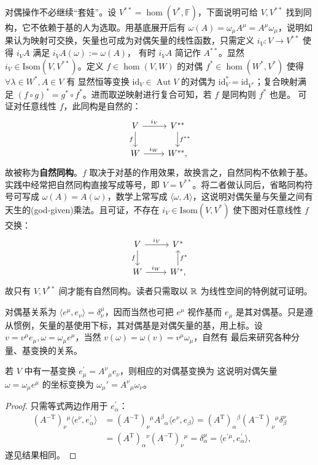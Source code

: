 对偶操作不必继续“套娃”。设 $V^{**}=\hom(V^*,\mathbb F)$，下面说明可给 $V,V^{**}$ 找到同构，它不依赖于基的人为选取。用基底展开后有 $\omega(A)=\omega_\mu A^\mu=A^\mu\omega_\mu$，说明如果认为映射可交换，矢量也可成为对偶矢量的线性函数，只需定义 $i_V:V\to V^{**}$ 使得 $i_V A$ 满足 $i_V A(\omega):=\omega(A)$，
有时 $i_V A$ 简记作 $A^{**}$。显然 $i_V\in\mathrm{Isom}(V,V^{**})$。定义 $f\in\hom(V,W)$ 的对偶 $f^*\in\hom(W^*, V^*)$ 使得 $\forall\lambda\in W^*,A\in V$ 有
显然恒等变换 $\mathrm{id}_V\in \operatorname{Aut} V$ 的对偶为 $\mathrm{id}_V^*=\mathrm{id}_{V^*}$；复合映射满足 $(f\circ g)^*=g^*\circ f^*$。进而取逆映射进行复合可知，若 $f$ 是同构则 $f^*$ 也是。
可证对任意线性 $f$，此同构是自然的：
\[\begin{tikzcd}
    V \arrow[r, "i_V"] \ar[d, "f"'] & V^{**} \arrow[d, "f^{**}"] \\
    W \arrow[r, "i_W"] & W^{**} ,
\end{tikzcd}\]
故被称为\textbf{自然同构}。$f$ 取决于对基的作用效果，故换言之，自然同构不依赖于基。实践中经常把自然同构直接写成等号，即 $V=V^{* *}$。将二者做认同后，省略同构符号可写成 $\omega(A)=A(\omega)$，数学上常写成 $\langle\omega,A\rangle$，这说明对偶矢量与矢量之间有天生的(god-given)乘法。且可证，不存在 $i_V\in\mathrm{Isom}(V,V^*)$ 使下图对任意线性 $f$ 交换：
\[\begin{tikzcd}
    V \arrow[r, "i_V"] \ar[d, "f"'] & V^{*} \\
    W \arrow[r, "i_W"] & W^{*} \arrow[u, "f^{*}"'],
\end{tikzcd}\]
故只有 $V,V^{* *}$ 间才能有自然同构。读者只需取以 $\mathbb{R}$ 为线性空间的特例就可证明。

对偶基关系为 $\langle e^\mu,e_\nu\rangle=\delta^\mu_\nu$，因而当然也可把 $e^\mu$ 视作基而 $e_\mu$ 是其对偶基。只是遵从惯例，矢量的基使用下标，其对偶基是对偶矢量的基，用上标。设 $v=v^\mu e_\mu,\omega=\omega_\mu e^\mu$，当然 $v(\omega)=\omega(v)=v^\mu\omega_\mu$，自然有
最后来研究各种分量、基变换的关系。
\begin{theorem}
    若 $V$ 中有一基变换 $e_\mu^{\prime}=A^\nu{ }_\mu e_\nu$，则相应的对偶基变换为
这说明对偶矢量 $\omega=\omega_\mu e^\mu$ 的坐标变换为 $\omega_\mu'=A^\nu{}_\mu\omega_\nu$。
\end{theorem}

\begin{proof}
    只需等式两边作用于 $e_\alpha^{\prime}$：
    \begin{align*}({A}^{-\mathrm{T}})_\nu{}^\mu\langle e^{\nu}, e_\alpha^{\prime}\rangle & =(A^{-\mathrm{T}})_\nu{ }^\mu A^\beta{}_\alpha\langle e^{\nu}, e_\beta\rangle  =(A^\mathrm{T})_\alpha{ }^\beta (A^{-\mathrm{T}})_\nu{ }^\mu \delta_\beta^\nu\\ &=(A^\mathrm{T})_\alpha{ }^\nu (A^{-\mathrm{T}})_\nu{ }^\mu=\delta_\alpha^\mu=\langle e^{\prime \mu}, e_\alpha^{\prime}\rangle,\end{align*}
    遂见结果相同。
\end{proof}

